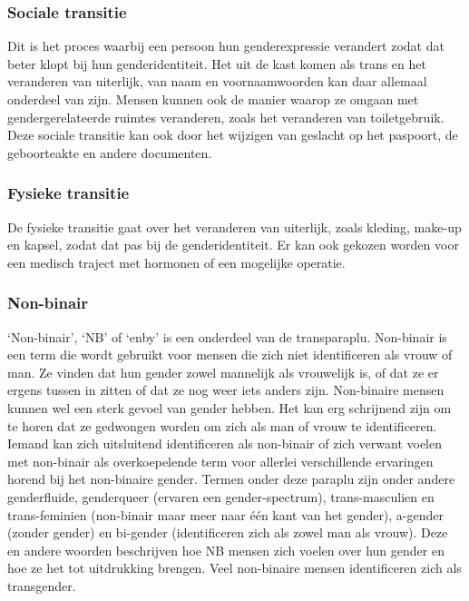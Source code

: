 \documentclass[12pt,openany]{book}
\begin{document}
\subsubsection*{Sociale transitie}

Dit is het proces waarbij een persoon hun genderexpressie verandert zodat dat beter klopt bij hun genderidentiteit. Het uit de kast komen als trans en het veranderen van uiterlijk, van naam en voornaamwoorden kan daar allemaal onderdeel van zijn. Mensen kunnen ook de manier waarop ze omgaan met gendergerelateerde ruimtes veranderen, zoals het veranderen van toiletgebruik. Deze sociale transitie kan ook door het wijzigen van geslacht op het paspoort, de geboorteakte en andere documenten.

\subsubsection*{Fysieke transitie}

De fysieke transitie gaat over het veranderen van uiterlijk, zoals kleding, make-up en kapsel, zodat dat pas bij de genderidentiteit. Er kan ook gekozen worden voor een medisch traject met hormonen of een mogelijke operatie.  

\subsubsection*{Non-binair}

‘Non-binair’, ‘NB’ of ‘enby’ is een onderdeel van de transparaplu. Non-binair is een term die wordt gebruikt voor mensen die zich niet identificeren als vrouw of man. Ze vinden dat hun gender zowel mannelijk als vrouwelijk is, of dat ze er ergens tussen in zitten of dat ze nog weer iets anders zijn. Non-binaire mensen kunnen wel een sterk gevoel van gender hebben. Het kan erg schrijnend zijn om te horen dat ze gedwongen worden om zich als man of vrouw te identificeren. Iemand kan zich uitsluitend identificeren als non-binair of zich verwant voelen met non-binair als overkoepelende term voor allerlei verschillende ervaringen horend bij het non-binaire gender. Termen onder deze paraplu zijn onder andere genderfluide, genderqueer (ervaren een gender-spectrum), trans-masculien en trans-feminien (non-binair maar meer naar één kant van het gender), a-gender (zonder gender) en bi-gender (identificeren zich als zowel man als vrouw). Deze en andere woorden beschrijven hoe NB mensen zich voelen over hun gender en hoe ze het tot uitdrukking brengen. Veel non-binaire mensen identificeren zich als transgender. 
\end{document}
